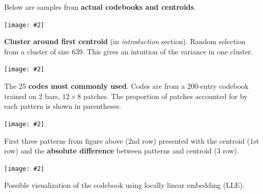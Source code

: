\documentclass[portrait,a0b,final]{a0poster}
\newenvironment{poster}{
  \begin{center}
  \begin{minipage}[c]{0.98\textwidth}
}{
  \end{minipage} 
  \end{center}
}
\newcommand{\myfig}[3][0]{
\begin{center}
  \vspace{1.5cm}
  \texttt{[image: \#2]}
  \nobreak\medskip
\end{center}}
\begin{document}
\begin{poster}
\begin{multicols}{3}
Below are samples from \textbf{actual codebooks and centroids}.

\myfig[0]{close_patterns1.ps}{.8}
\begin{center}
\begin{minipage}[c]{.7\columnwidth}
\begin{small}
\textbf{Cluster around first centroid} (in \textit{introduction} section).
Random selection from a cluster of size $639$. 
This gives an intuition of the
variance in one cluster.
\end{small}
\end{minipage}
\end{center}

\myfig[0]{codes1.ps}{.8}
\begin{center}
\begin{minipage}[c]{.7\columnwidth}
\begin{small}
The 25 \textbf{codes most commonly used}. 
Codes are from a $200$-entry codebook trained
on $2$ bars, $12 × 8$ patches. The proportion of patches accounted
for by each pattern is shown in parentheses.
\end{small}
\end{minipage}
\end{center}

\myfig[0]{close_patterns_diff.ps}{.8}
\begin{center}
\begin{minipage}[c]{.7\columnwidth}
\begin{small}
First three patterns from figure above ($2$nd row) presented
with the centroid ($1$st row) and the \textbf{absolute difference} between 
patterns and centroid ($3$ row).
\end{small}
\end{minipage}
\end{center}

\newpage

\mbox{} %
\vspace{-1cm}
\myfig[0]{codes_lle.ps}{.9}

\begin{center}
\begin{minipage}[c]{.7\columnwidth}
\begin{small}
Possible visualization of the codebook using locally linear
embedding (LLE).
\end{small}
\end{minipage}
\end{center}


\end{multicols}
\end{poster}
\end{document}
